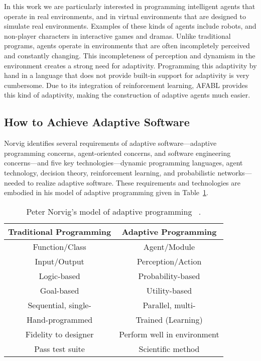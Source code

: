 In this work we are particularly interested in programming intelligent agents that operate in real environments, and in virtual environments that are designed to simulate real environments.  Examples of these kinds of agents include robots, and non-player characters in interactive games and dramas.  Unlike traditional programs, agents operate in environments that are often incompletely perceived and constantly changing.  This incompleteness of perception and dynamism in the environment creates a strong need for adaptivity.  Programming this adaptivity by hand in a language that does not provide built-in support for adaptivity is very cumbersome.  Due to its integration of reinforcement learning, AFABL provides this kind of adaptivity, making the construction of adaptive agents much easier.


\subsection{How to Achieve Adaptive Software}

Norvig identifies several requirements of adaptive soft\-ware---adaptive programming concerns, agent-oriented concerns, and software engineering concerns---and five key technologies---dynamic programming languages, agent technology, decision theory, reinforcement learning, and probabilistic networks---needed to realize adaptive software.  These requirements and technologies are embodied in his model of adaptive programming given in Table~\ref{tab:adaptive-model}.

\begin{table}[h]

\begin{center}
\begin{tabular}{|c|c|}\hline
Traditional Programming & Adaptive Programming \\ \hline
Function/Class & Agent/Module \\
Input/Output & Perception/Action \\
Logic-based & Probability-based \\
Goal-based & Utility-based \\
Sequential, single- & Parallel, multi- \\
Hand-programmed & Trained (Learning) \\
Fidelity to designer & Perform well in environment \\
Pass test suite & Scientific method\\ \hline
\end{tabular}
\caption{Peter Norvig's model of adaptive programming
  ~\cite{norvig1998decision}.}
\label{tab:adaptive-model}
\end{center}

\end{table}

